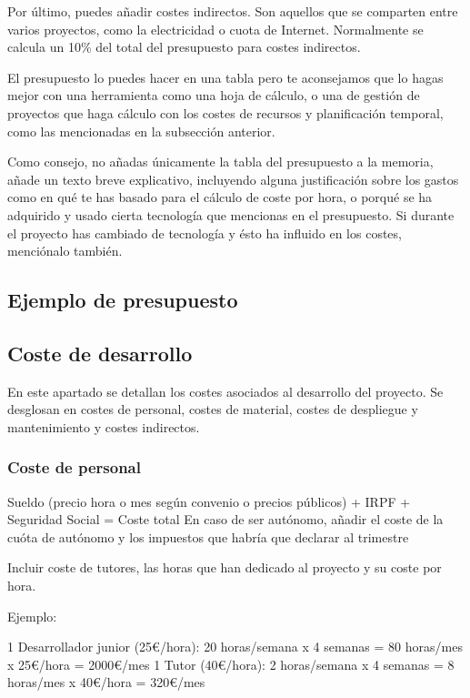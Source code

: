 Por último, puedes añadir costes indirectos. Son aquellos que se comparten entre varios proyectos, como la electricidad o cuota de Internet. Normalmente se calcula un 10\% del total del presupuesto para costes indirectos.

El presupuesto lo puedes hacer en una tabla pero te aconsejamos que lo hagas mejor con una herramienta como una hoja de cálculo, o una de gestión de proyectos que haga cálculo con los costes de recursos y planificación temporal, como las mencionadas en la subsección anterior.

Como consejo, no añadas únicamente la tabla del presupuesto a la memoria, añade un texto breve explicativo, incluyendo alguna justificación sobre los gastos como en qué te has basado para el cálculo de coste por hora, o porqué se ha adquirido y usado cierta tecnología que mencionas en el presupuesto. Si durante el proyecto has cambiado de tecnología y ésto ha influido en los costes, menciónalo también.

\subsection{Ejemplo de presupuesto}

\subsection{Coste de desarrollo}

En este apartado se detallan los costes asociados al desarrollo del proyecto. Se desglosan en costes de personal, costes de material, costes de despliegue y mantenimiento y costes indirectos.

\subsubsection{Coste de personal}

Sueldo (precio hora o mes según convenio o precios públicos) + IRPF + Seguridad Social = Coste total
En caso de ser autónomo, añadir el coste de la cuóta de autónomo y los impuestos que habría que declarar al trimestre

Incluir coste de tutores, las horas que han dedicado al proyecto y su coste por hora. 

Ejemplo:

1 Desarrollador junior (25€/hora): 20 horas/semana x 4 semanas = 80 horas/mes x 25€/hora = 2000€/mes 
1 Tutor (40€/hora): 2 horas/semana x 4 semanas = 8 horas/mes x 40€/hora = 320€/mes 


